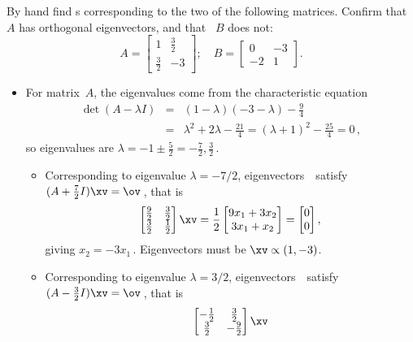 \begin{example} \label{eg:2x2orthevec}
By hand find s corresponding to the two  of the following matrices.
Confirm that ~\(A\) has orthogonal eigenvectors, and that ~\(B\) does not:
\begin{equation*}
A=\begin{bmatrix} 1&\frac32\\\frac32&-3 \end{bmatrix};\quad
B=\begin{bmatrix} 0&-3\\-2&1 \end{bmatrix}.
\end{equation*}

\begin{solution} 
\begin{itemize}
\item For matrix~\(A\), the eigenvalues come from the characteristic equation
\begin{eqnarray*}
\det(A-\lambda I)&=&(1-\lambda)(-3-\lambda)-\tfrac94
\\&=&\lambda^2+2\lambda-\tfrac{21}4
=(\lambda+1)^2-\tfrac{25}4=0\,,
\end{eqnarray*}
so eigenvalues are \(\lambda=-1\pm\tfrac52=-\tfrac72,\tfrac32\)\,.
\begin{itemize}
\item Corresponding to eigenvalue \(\lambda=-7/2\), eigenvectors~\xv\ satisfy \((A+\tfrac72I)\xv=\ov\)\,, that is
\begin{equation*}
\begin{bmatrix} \frac92&\frac32\\\frac32&\frac12 \end{bmatrix}\xv
=\frac12\begin{bmatrix} 9x_1+3x_2\\3x_1+x_2 \end{bmatrix}
=\begin{bmatrix} 0\\0 \end{bmatrix},
\end{equation*}
giving \(x_2=-3x_1\)\,.  
Eigenvectors must be \(\xv\propto(1,-3)\).
\item Corresponding to eigenvalue \(\lambda=3/2\), eigenvectors~\xv\ satisfy \((A-\tfrac32I)\xv=\ov\)\,, that is
\begin{equation*}
\begin{bmatrix} -\frac12&\frac32\\\frac32&-\frac92 \end{bmatrix}\xv

\end{equation*}
\end{itemize}
\end{itemize}
\end{solution}
\end{example}
